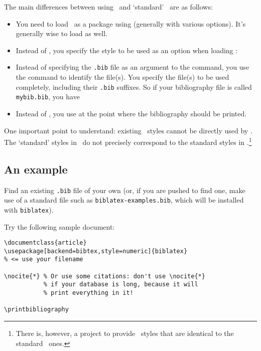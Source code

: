 The main differences between using \biblatex\ and `standard' \bibtex\ are as follows:

\begin{itemize}
\item You need to load \biblatex\ as a package using  (generally with various options). It's generally wise to load  as well.
\item Instead of , you specify the style to be used as an option when loading \biblatex:\\
\centerline{}
\item Instead of specifying the \verb|.bib| file as an argument to the  command, you use the command  to identify the file(s). You specify the file(s) to be used completely, including their \verb|.bib| suffixes. So if your bibliography file is called \verb|mybib.bib|, you have\\
\centerline{}
\item Instead of , you use  at the point where the bibliography should be printed.
\end{itemize}

One important point to understand: existing \bibtex\ styles cannot be directly used by \biblatex. The `standard' styles in \biblatex\ do not precisely correspond to the standard styles in \bibtex.\footnote{There is, however, a project to provide \biblatex\ styles that are identical to the standard \bibtex\ ones.}

\subsection{An example}

Find an existing \verb|.bib| file of your own (or, if you are pushed to find one, make use of a standard file such as \verb|biblatex-examples.bib|, which will be installed with \verb|biblatex|).

Try the following sample document:

\begin{verbatim}
\documentclass{article}
\usepackage[backend=bibtex,style=numeric]{biblatex}
% <= use your filename

\nocite{*} % Or use some citations: don't use \nocite{*}
           % if your database is long, because it will
           % print everything in it!

\printbibliography

\end{verbatim}

